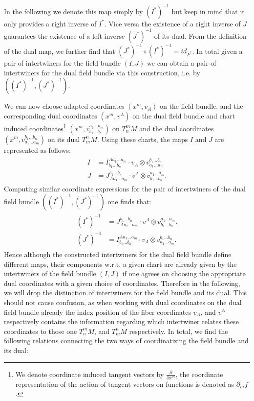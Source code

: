 \documentclass[a4paper,12pt, DIV=14, BCOR=5mm, twoside, headsepline, numbers=noenddot]{scrbook}
\begin{document}
In the following we denote this map simply by $(I^{\ast})^{-1}$ but keep in mind that it only provides a right inverse of $I^{\ast}$. Vice versa the existence of a right inverse of $J$ guarantees the existence of a left inverse $(J^{\ast})^{-1}$ of its dual. From the definition of the dual map, we further find that $(J^{\ast})^{-1} \circ (I^{\ast})^{-1} = id_{F^{\ast}}$. In total given a pair of intertwiners for the field bundle $(I,J)$ we can obtain a pair of intertwiners for the dual field bundle via this construction, i.e. by $((I^{\ast})^{-1}, (J^{\ast})^{-1})$. 

We can now choose adapted coordinates $(x^m,v_A)$ on the field bundle, and the corresponding dual coordinates $(x^m, v^A)$ on the dual field bundle and chart induced coordinates\footnote{We denote coordinate induced tangent vectors by $\frac{\partial}{\partial x^m}$, the coordinate representation of the action of tangent vectors on functions is denoted as $\partial_m f$. } $(x^m, v^{a_1 ... a_m}_{b_1 ... b_n})$ on $T^m_n M$ and the dual coordinates $(x^m, v^{b_1 ... b_n}_{a_1 ... a_m})$ on its dual $T^n_mM$. Using these charts, the maps $I$ and $J$ are represented as follows:
\begin{align} \label{interAbs}
    \begin{aligned}
    I &= I^{A a_1 ... a_m}_{b_1 ... b_n} \cdot v_A \otimes  v^{b_1 ... b_n}_{a_1 ... a_m}\\
    J &= J^{b_1 ... b_n}_{A a_1 ... a_m} \cdot v^A \otimes  v^{a_1 ... a_m}_{b_1 ... b_n}.
    \end{aligned}
\end{align}
Computing similar coordinate expressions for the pair of intertwiners of the dual field bundle $((I^{\ast})^{-1}, (J^{\ast})^{-1})$ one finds that:
\begin{align} \label{dualInterAbs}
    \begin{aligned}
         (I^{\ast})^{-1} &= J^{b_1 ... b_n}_{A a_1 ... a_m} \cdot v^A \otimes  v^{a_1 ... a_m}_{b_1 ... b_n}.\\
         (J^{\ast})^{-1} &= I^{A a_1 ... a_m}_{b_1 ... b_n} \cdot v_A \otimes  v^{b_1 ... b_n}_{a_1 ... a_m}.
    \end{aligned}
\end{align} 
Hence although the constructed intertwiners for the dual field bundle define different maps, their components w.r.t. a given chart are already given by the intertwiners of the field bundle $(I,J)$ if one agrees on choosing the appropriate dual coordinates with a given choice of coordinates. Therefore in the following, we will drop the distinction of intertwiners for the field bundle and its dual.  This should not cause confusion, as when working with dual coordinates on the dual field bundle already the index position of the fiber coordinates $v_A$, and $v^{A}$ respectively contains the information regarding which intertwiner relates these coordinates to those one $T^m_n M$, and $T^n_mM$ respectively. In total, we find the following relations connecting the two ways of coordinatizing the field bundle and its dual: 
\end{document}
